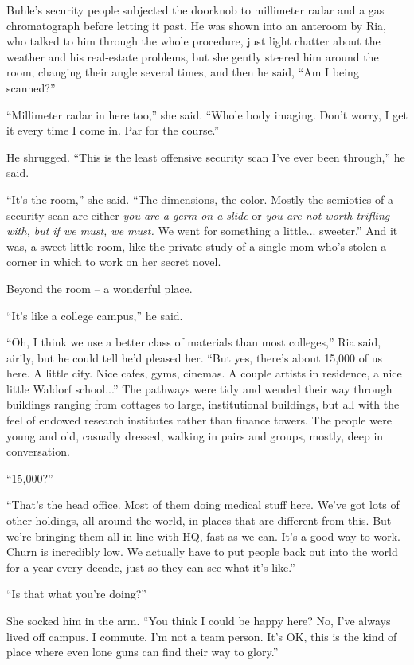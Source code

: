 \tb

Buhle's security people subjected the doorknob to millimeter radar and 
a gas chromatograph before letting it past. He was shown into an 
anteroom by Ria, who talked to him through the whole procedure, just 
light chatter about the weather and his real-estate problems, but she 
gently steered him around the room, changing their angle several times, 
and then he said, “Am I being scanned?”

“Millimeter radar in here too,” she said. “Whole body imaging. 
Don't worry, I get it every time I come in. Par for the course.”

He shrugged. “This is the least offensive security scan I've ever 
been through,” he said.

“It's the room,” she said. “The dimensions, the color. Mostly the 
semiotics of a security scan are either \emph{you are a germ on a 
slide} or \emph{you are not worth trifling with, but if we must, we 
must.} We went for something a little... sweeter.” And it was, a 
sweet little room, like the private study of a single mom who's stolen 
a corner in which to work on her secret novel.

Beyond the room -- a wonderful place.

“It's like a college campus,” he said.

“Oh, I think we use a better class of materials than most 
colleges,” Ria said, airily, but he could tell he'd pleased her. 
“But yes, there's about 15,000 of us here. A little city. Nice cafes, 
gyms, cinemas. A couple artists in residence, a nice little Waldorf 
school...” The pathways were tidy and wended their way through 
buildings ranging from cottages to large, institutional buildings, but 
all with the feel of endowed research institutes rather than finance 
towers. The people were young and old, casually dressed, walking in 
pairs and groups, mostly, deep in conversation.

“15,000?”

“That's the head office. Most of them doing medical stuff here. We've 
got lots of other holdings, all around the world, in places that are 
different from this. But we're bringing them all in line with HQ, fast 
as we can. It's a good way to work. Churn is incredibly low. We 
actually have to put people back out into the world for a year every 
decade, just so they can see what it's like.”

“Is that what you're doing?”

She socked him in the arm. “You think I could be happy here? No, I've 
always lived off campus. I commute. I'm not a team person. It's OK, 
this is the kind of place where even lone guns can find their way to 
glory.”

